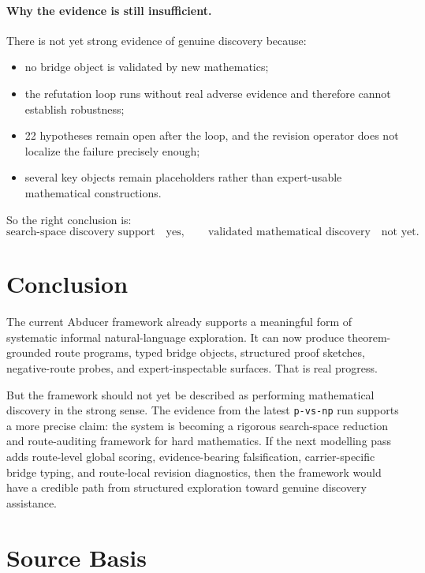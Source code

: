 \documentclass[11pt]{article}
\begin{document}
\paragraph{Why the evidence is still insufficient.}

There is not yet strong evidence of genuine discovery because:

\begin{itemize}[leftmargin=*,itemsep=0.2em]
\item no bridge object is validated by new mathematics;
\item the refutation loop runs without real adverse evidence and therefore cannot establish robustness;
\item 22 hypotheses remain open after the loop, and the revision operator does not localize the failure precisely enough;
\item several key objects remain placeholders rather than expert-usable mathematical constructions.
\end{itemize}

So the right conclusion is:
\[
\text{search-space discovery support} \quad \text{yes}, \qquad
\text{validated mathematical discovery} \quad \text{not yet}.
\]

\section{Conclusion}

The current Abducer framework already supports a meaningful form of systematic informal natural-language exploration. It can now produce theorem-grounded route programs, typed bridge objects, structured proof sketches, negative-route probes, and expert-inspectable surfaces. That is real progress.

But the framework should not yet be described as performing mathematical discovery in the strong sense. The evidence from the latest \texttt{p-vs-np} run supports a more precise claim: the system is becoming a rigorous search-space reduction and route-auditing framework for hard mathematics. If the next modelling pass adds route-level global scoring, evidence-bearing falsification, carrier-specific bridge typing, and route-local revision diagnostics, then the framework would have a credible path from structured exploration toward genuine discovery assistance.

\section{Source Basis}
\end{document}
